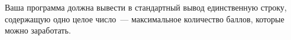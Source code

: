 Ваша программа должна вывести в стандартный вывод единственную строку, содержащую одно
целое число~--- максимальное количество баллов, которые можно заработать. 
